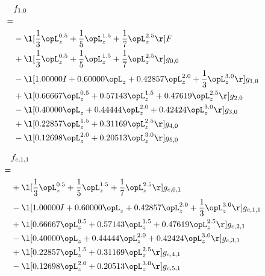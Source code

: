 \begin{alignat}{2} 
\label{eq:f_10_0} 
& f_{1,0} \nonumber \\ 
 = \\ 
& - \l[ \frac{1}{3} \opL_z^{0.5} + \frac{1}{5} \opL_z^{1.5} + \frac{1}{7} \opL_z^{2.5}  \r] F \nonumber \\ 
& + \l[ \frac{1}{3} \opL_z^{0.5} + \frac{1}{5} \opL_z^{1.5} + \frac{1}{7} \opL_z^{2.5}  \r] g_{0,0} \nonumber \\ 
& - \l[  1.00000 I +  0.60000 \opL_z +  0.42857 \opL_z^{2.0} + \frac{1}{3} \opL_z^{3.0}  \r] g_{1,0} \nonumber \\ 
& + \l[  0.66667 \opL_z^{0.5} +  0.57143 \opL_z^{1.5} +  0.47619 \opL_z^{2.5}  \r] g_{2,0} \nonumber \\ 
& - \l[  0.40000 \opL_z +  0.44444 \opL_z^{2.0} +  0.42424 \opL_z^{3.0}  \r] g_{3,0} \nonumber \\ 
& + \l[  0.22857 \opL_z^{1.5} +  0.31169 \opL_z^{2.5}  \r] g_{4,0} \nonumber \\ 
& - \l[  0.12698 \opL_z^{2.0} +  0.20513 \opL_z^{3.0}  \r] g_{5,0} \nonumber \\ 
\end{alignat} 


\begin{alignat}{2} 
\label{eq:f_11_0} 
& f_{c,1,1} \nonumber \\ 
 = \\ 
& + \l[ \frac{1}{3} \opL_z^{0.5} + \frac{1}{5} \opL_z^{1.5} + \frac{1}{7} \opL_z^{2.5}  \r] g_{c,0,1} \nonumber \\ 
& - \l[  1.00000 I +  0.60000 \opL_z +  0.42857 \opL_z^{2.0} + \frac{1}{3} \opL_z^{3.0}  \r] g_{c,1,1} \nonumber \\ 
& + \l[  0.66667 \opL_z^{0.5} +  0.57143 \opL_z^{1.5} +  0.47619 \opL_z^{2.5}  \r] g_{c,2,1} \nonumber \\ 
& - \l[  0.40000 \opL_z +  0.44444 \opL_z^{2.0} +  0.42424 \opL_z^{3.0}  \r] g_{c,3,1} \nonumber \\ 
& + \l[  0.22857 \opL_z^{1.5} +  0.31169 \opL_z^{2.5}  \r] g_{c,4,1} \nonumber \\ 
& - \l[  0.12698 \opL_z^{2.0} +  0.20513 \opL_z^{3.0}  \r] g_{c,5,1} \nonumber \\ 
\end{alignat} 


